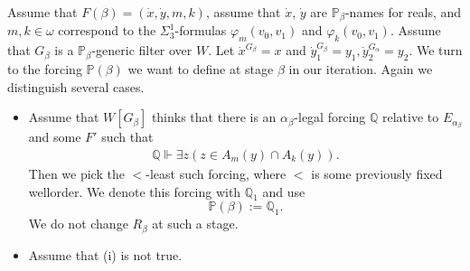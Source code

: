 \documentclass[a4paper,11pt]{article}
\newcommand{\forceP}{\mathbb{P}}
\newcommand{\forceQ}{\mathbb{Q}}
\begin{document}
Assume that $F(\beta)= (\dot{x},\dot{y},m,k)$, assume that $\dot{x}$, $\dot{y}$ are $\forceP_{\beta}$-names for reals, and  $m,k\in \omega$ correspond to the $\Sigma^1_3$-formulas $\varphi_m(v_0,v_1)$ and $\varphi_k(v_0,v_1)$. Assume that $G_{\beta}$ is a $\forceP_{\beta}$-generic filter over $W$. Let $\dot{x}^{G_{\beta}}=x$ and $\dot{y}_1^{G_{\beta} }=y_1, \dot{y}_2^{G_{\alpha}}=y_2$. 
We turn to the forcing $\forceP(\beta)$ we want to define at stage $\beta$ in our iteration.
Again we distinguish several cases.
\begin{itemize}
\item[(A)]  Assume that $W[G_{\beta}]$ thinks that there is an $\alpha_{\beta}$-legal forcing $\forceQ$ relative to $E_{\alpha_{\beta}}$ and some $F'$ such that 
\begin{align*}
\forceQ \Vdash 
\exists z (z\in A_m(y) \cap A_k(y)).
\end{align*}
Then we pick the $<$-least such forcing, where $<$ is some previously fixed wellorder. We denote this forcing with $\forceQ_1$
and use 
\[\forceP(\beta):= \forceQ_1.\]
We do not change $R_{\beta}$ at such a stage.

\item[(B)] Assume that (i) is not true.

\begin{itemize} 


\end{itemize}
\end{itemize}
\end{document}
